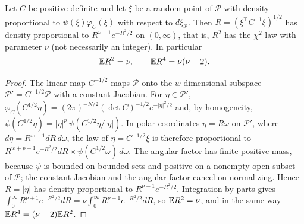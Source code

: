 \begin{lemma}\label{lem:correction-radial}
Let $C$ be positive definite and let $\xi$ be a random point of $\mathcal P$ with density proportional to $\psi(\xi)\varphi_C(\xi)$ with respect to $d\xi_{\mathcal P}$. Then $R=(\xi^{\top}C^{-1}\xi)^{1/2}$ has density proportional to $R^{\nu-1}e^{-R^2/2}$ on $(0,\infty)$, that is, $R^2$ has the $\chi^2$ law with parameter $\nu$ (not necessarily an integer). In particular
\begin{equation}\label{eq:correction-chi}
\mathbb E R^2=\nu,\qquad \mathbb E R^4=\nu(\nu+2).
\end{equation}
\end{lemma}

\begin{proof}
The linear map $C^{-1/2}$ maps $\mathcal P$ onto the $w$-dimensional subspace $\mathcal P'=C^{-1/2}\mathcal P$ with a constant Jacobian. For $\eta\in\mathcal P'$, $\varphi_C(C^{1/2}\eta)=(2\pi)^{-N/2}(\det C)^{-1/2}e^{-|\eta|^2/2}$ and, by homogeneity, $\psi(C^{1/2}\eta)=|\eta|^p\,\psi(C^{1/2}\eta/|\eta|)$. In polar coordinates $\eta=R\omega$ on $\mathcal P'$, where $d\eta=R^{w-1}dR\,d\omega$, the law of $\eta=C^{-1/2}\xi$ is therefore proportional to $R^{w+p-1}e^{-R^2/2}dR\times\psi(C^{1/2}\omega)\,d\omega$. The angular factor has finite positive mass, because $\psi$ is bounded on bounded sets and positive on a nonempty open subset of $\mathcal P$; the constant Jacobian and the angular factor cancel on normalizing. Hence $R=|\eta|$ has density proportional to $R^{\nu-1}e^{-R^2/2}$. Integration by parts gives $\int_0^\infty R^{\nu+1}e^{-R^2/2}dR=\nu\int_0^\infty R^{\nu-1}e^{-R^2/2}dR$, so $\mathbb E R^2=\nu$, and in the same way $\mathbb E R^4=(\nu+2)\mathbb E R^2$.
\end{proof}

